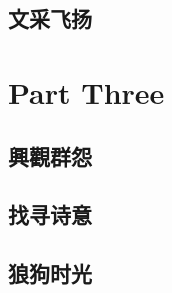 \documentclass[11pt,fleqn]{book} %
\begin{document}


\chapter{ 文采飞扬}






\part{Part Three}




\chapter{ 興觀群怨}







\chapter{ 找寻诗意}























\chapter{  狼狗时光}


% 

\end{document}
